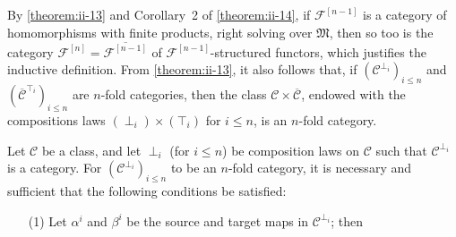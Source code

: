 \documentclass[a4paper,fleqn]{article}
\theoremstyle{plain}
\newenvironment{theorem}[1]
  {\renewcommand\theinnertheorem{#1}\innertheorem}
  {\endinnertheorem}
\theoremstyle{definition}
\renewcommand{\leq}{\leqslant}
\newcommand{\CC}{\mathcal{C}}
\newcommand{\MM}{\mathfrak{M}}
\newcommand{\FF}{\mathcal{F}}
\begin{document}
By \cref{theorem:ii-13} and Corollary~2 of \cref{theorem:ii-14}, if $\FF^{[n-1]}$ is a category of homomorphisms with finite products, right solving over $\MM$, then so too is the category $\FF^{[n]}=\overline{\FF^{[n-1]}}$ of $\FF^{[n-1]}$-structured functors, which justifies the inductive definition.
From \cref{theorem:ii-13}, it also follows that, if $(\CC^{\perp_i})_{i\leq n}$ and $(\overline{\CC}^{\top_i})_{i\leq n}$ are $n$-fold categories, then the class $\CC\times\overline{\CC}$, endowed with the compositions laws $(\perp_i)\times(\top_i)$ for $i\leq n$, is an $n$-fold category.

\begin{theorem}{8}
\label{theorem:ii-8}
  Let $\CC$ be a class, and let $\perp_i$ (for $i\leq n$) be composition laws on $\CC$ such that $\CC^{\perp_i}$ is a category.
  For $(\CC^{\perp_i})_{i\leq n}$ to be an $n$-fold category, it is necessary and sufficient that the following conditions be satisfied:
  \begin{enumerate}
    \item[\normalfont(1)]
      Let $\alpha^i$ and $\beta^i$ be the source and target maps in $\CC^{\perp_i}$;
      then
  \end{enumerate}
\end{theorem}




\nocite{*}

\begingroup
\let\clearpage\relax
  \printbibliography[keyword={orig},heading=bibintoc,title=Bibliography]

  \printbibliography[keyword={oc},title={Citations to the collected works}]

  \printbibliography[keyword={comm},title={Citations from comments in the collected works}]
\endgroup
\end{document}
